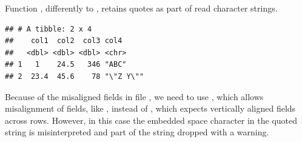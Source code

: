 \documentclass[krantz2]{krantz}\usepackage{knitr}
\begin{document}
Function , differently to , retains quotes as part of read character strings.

\begin{knitrout}\footnotesize
{}\color{fgcolor}\begin{kframe}
\begin{alltt}
\hlstd{(} \hlstd{=} \hlstd{)}
\end{alltt}


{\ttfamily\noindent\itshape\color{messagecolor}{\#\# Parsed with column specification:\\\#\# cols(\\\#\#\ \  col1 = col\_double(),\\\#\#\ \  col2 = col\_double(),\\\#\#\ \  col3 = col\_double(),\\\#\#\ \  col4 = col\_character()\\\#\# )}}\begin{verbatim}
## # A tibble: 2 x 4
##    col1  col2  col3 col4
##   <dbl> <dbl> <dbl> <chr>
## 1   1    24.5   346 "ABC"
## 2  23.4  45.6    78 "\"Z Y\""
\end{verbatim}
\end{kframe}
\end{knitrout}

Because of the misaligned fields in file , we need to use , which allows misalignment of fields, like , instead of , which expects vertically aligned fields across rows. However, in this case the embedded space character in the quoted string is misinterpreted and part of the string dropped with a warning.
\end{document}
